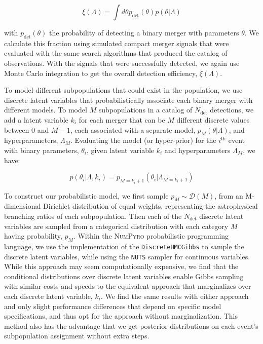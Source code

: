 \begin{equation} \label{eq:detfrac}
    \xi(\Lambda) = \int d\theta p_\mathrm{det}(\theta) p(\theta | \Lambda)
\end{equation}

\noindent with $p_\mathrm{det}(\theta)$ the probability of detecting a binary merger with parameters $\theta$. We calculate this fraction using simulated compact merger signals that were evaluated with the same search algorithms that produced the catalog of observations. With the signals that were successfully detected, we again use Monte Carlo integration to get the overall detection efficiency, $\xi(\Lambda)$.


To model different subpopulations that could exist in the population, we use discrete latent variables that probabilistically associate each binary merger with different models. To model $M$ subpopulations in a catalog of $N_\mathrm{det}$ detections, we add a latent variable $k_i$ for each merger that can be $M$ different discrete values between $0$ and $M-1$, each associated with a separate model, $p_{M}(\theta | \Lambda)$, and hyperparameters, $\Lambda_M$. Evaluating the model (or hyper-prior) for the $i^\mathrm{th}$ event with binary parameters, $\theta_i$, given latent variable $k_i$ and hyperparameters $\Lambda_M$, we have:

\begin{equation} \label{eq:latent}
    p(\theta_i | \Lambda, k_i) = p_{M=k_i+1}(\theta_i | \Lambda_{M=k_i+1})
\end{equation}

\noindent To construct our probabilistic model, we first sample $p_M \sim \mathcal{D}(M)$, from an M-dimensional Dirichlet distribution of equal weights, representing the astrophysical branching ratios of each subpopulation. Then each of the $N_\mathrm{det}$ discrete latent variables are sampled from a categorical distribution with each category $M$ having probability, $p_M$. Within the \textsc{NumPyro} \citep{1810.09538,1912.11554} probabilistic programming language, we use the implementation of the \texttt{DiscreteHMCGibbs} \citep{Liu1996PeskunsTA} to sample the discrete latent variables, while using the \texttt{NUTS} \citep{1111.4246} sampler for continuous variables. While this approach may seem computationally expensive, we find that the conditional distributions over discrete latent variables enable Gibbs sampling with similar costs and speeds to the equivalent approach that marginalizes over each discrete latent variable, $k_i$. We find the same results with either approach and only slight performance differences that depend on specific model specifications, and thus opt for the approach without marginalization. This method also has the advantage that we get posterior distributions on each event's subpopulation assignment without extra steps.

